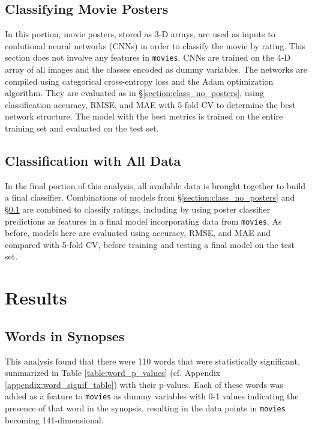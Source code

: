\documentclass[12pt, oneside]{article}   	%
\begin{document}
\subsection{Classifying Movie Posters}
\label{section:class_posters}

In this portion, movie posters, stored as 3-D arrays, are used as inputs to conlutional neural networks (CNNs) in order to classify the movie by rating. This section does not involve any features in \texttt{movies}. CNNs are trained on the 4-D array of all images and the classes encoded as dummy variables. The networks are compiled using categorical cross-entropy loss and the Adam optimization algorithm. They are evaluated as in \S \ref{section:class_no_posters}, using classification accuracy, RMSE, and MAE with 5-fold CV to determine the best network structure. The model with the best metrics is trained on the entire training set and evaluated on the test set.

\subsection{Classification with All Data}

In the final portion of this analysis, all available data is brought together to build a final classifier. Combinations of models from \S \ref{section:class_no_posters} and \S \ref{section:class_posters} are combined to classify ratings, including by using poster classifier predictions as features in a final model incorporating data from \texttt{movies}. As before, models here are evaluated using accuracy, RMSE, and MAE and compared with 5-fold CV, before training and testing a final model on the test set.

\newpage

\section{Results}

\subsection{Words in Synopses}
\label{section:words_results}

This analysis found that there were 110 words that were statistically significant, summarized in Table \ref{table:word_p_values} (cf. Appendix \ref{appendix:word_signif_table}) with their p-values. Each of these words was added as a feature to \texttt{movies} as dummy variables with 0-1 values indicating the presence of that word in the synopsis, resulting in the data points in \texttt{movies} becoming 141-dimensional.
\end{document}
